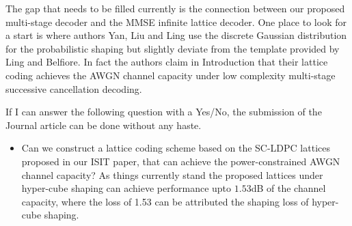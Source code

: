 \documentclass[12pt]{article}
\begin{document}
The gap that needs to be filled currently is the connection between our proposed multi-stage decoder and the MMSE infinite lattice decoder. One place to look for a start is \cite{yan2014construction} where authors Yan, Liu and Ling use the discrete Gaussian distribution for the probabilistic shaping but slightly deviate from the template provided by Ling and Belfiore. In fact the authors claim in Introduction that their lattice coding achieves the AWGN channel capacity under low complexity multi-stage successive cancellation decoding. 

If I can answer the following question with a Yes/No, the submission of the Journal article can be done without any haste.
\begin{itemize}
\item Can we construct a lattice coding scheme based on the SC-LDPC lattices proposed in our ISIT paper, that can achieve the power-constrained AWGN channel capacity? As things currently stand the proposed lattices under hyper-cube shaping can achieve performance upto $1.53$dB of the channel capacity, where the loss of 1.53 can be attributed the shaping loss of hyper-cube shaping.
\end{itemize}





\end{document}
